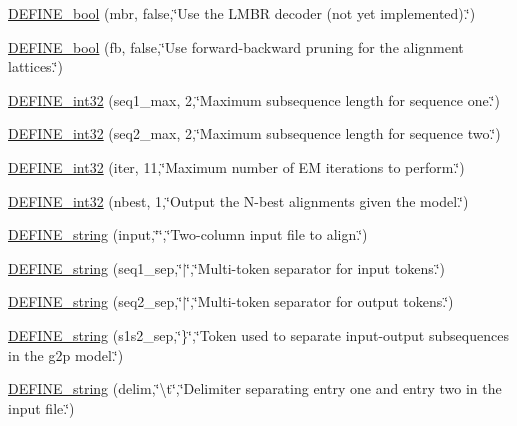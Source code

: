 \begin{DoxyCompactItemize}
\item 
\hyperlink{phonetisaurus-align_8cc_a6b13d28e16e0917a096b2aa6f9ead009}{D\+E\+F\+I\+N\+E\+\_\+bool} (mbr, false,\char`\"{}Use the L\+M\+BR decoder (not yet implemented).\char`\"{})
\item 
\hyperlink{phonetisaurus-align_8cc_ae8d43d903930ceb212c39e1a2aca8b05}{D\+E\+F\+I\+N\+E\+\_\+bool} (fb, false,\char`\"{}Use forward-\/backward pruning for the alignment lattices.\char`\"{})
\item 
\hyperlink{phonetisaurus-align_8cc_a6ef13ec1f28831ad404a0a2bf10190e0}{D\+E\+F\+I\+N\+E\+\_\+int32} (seq1\+\_\+max, 2,\char`\"{}Maximum subsequence length for sequence one.\char`\"{})
\item 
\hyperlink{phonetisaurus-align_8cc_aeef73ba59fa40f086987502d4160145d}{D\+E\+F\+I\+N\+E\+\_\+int32} (seq2\+\_\+max, 2,\char`\"{}Maximum subsequence length for sequence two.\char`\"{})
\item 
\hyperlink{phonetisaurus-align_8cc_a78f73c5db31a8e4745a84fb4c872961e}{D\+E\+F\+I\+N\+E\+\_\+int32} (iter, 11,\char`\"{}Maximum number of EM iterations to perform.\char`\"{})
\item 
\hyperlink{phonetisaurus-align_8cc_a26d5adc23a533d58ec8a5b0167b87594}{D\+E\+F\+I\+N\+E\+\_\+int32} (nbest, 1,\char`\"{}Output the N-\/best alignments given the model.\char`\"{})
\item 
\hyperlink{phonetisaurus-align_8cc_a18eb0acd74d210b766de65024d9a73ab}{D\+E\+F\+I\+N\+E\+\_\+string} (input,\char`\"{}\char`\"{},\char`\"{}Two-\/column input file to align.\char`\"{})
\item 
\hyperlink{phonetisaurus-align_8cc_a855693efd2a698fa106e2214f87cf1b2}{D\+E\+F\+I\+N\+E\+\_\+string} (seq1\+\_\+sep,\char`\"{}$\vert$\char`\"{},\char`\"{}Multi-\/token separator for input tokens.\char`\"{})
\item 
\hyperlink{phonetisaurus-align_8cc_af00da9375ee6e41c13c700d3b3bbbed8}{D\+E\+F\+I\+N\+E\+\_\+string} (seq2\+\_\+sep,\char`\"{}$\vert$\char`\"{},\char`\"{}Multi-\/token separator for output tokens.\char`\"{})
\item 
\hyperlink{phonetisaurus-align_8cc_a42080c49bec024a5029ca421ac861e78}{D\+E\+F\+I\+N\+E\+\_\+string} (s1s2\+\_\+sep,\char`\"{}\}\char`\"{},\char`\"{}Token used to separate input-\/output subsequences in the g2p model.\char`\"{})
\item 
\hyperlink{phonetisaurus-align_8cc_a59fc363efa8b295fcc598dbead5f29a4}{D\+E\+F\+I\+N\+E\+\_\+string} (delim,\char`\"{}\textbackslash{}t\char`\"{},\char`\"{}Delimiter separating entry one and entry two in the input file.\char`\"{})

\end{DoxyCompactItemize}
